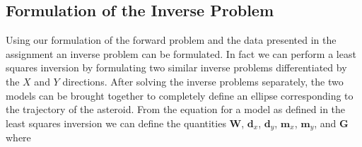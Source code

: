 \documentclass[12pt,runningheads]{article}
\begin{document}
\subsection*{Formulation of the Inverse Problem}
Using our formulation of the forward problem and the data presented in the assignment an inverse problem can be formulated. In fact we can perform a least squares inversion by formulating two similar inverse problems differentiated by the $X$ and $Y$ directions. After solving the inverse problems separately, the two models can be brought together to completely define an ellipse corresponding to the trajectory of the asteroid. From the equation for a model as defined in the least squares inversion we can define the quantities \textbf{W}, $\textbf{d}_{x}$, $\textbf{d}_{y}$, $\textbf{m}_{x}$, $\textbf{m}_{y}$, and \textbf{G} where \\
\end{document}

